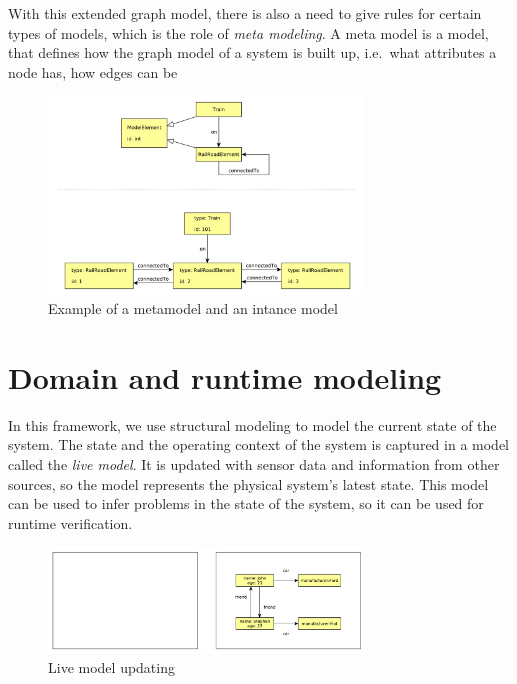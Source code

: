 With this extended graph model, there is also a need to give rules for certain types of models, which is the role of \emph{meta modeling}.
A meta model is a model, that defines how the graph model of a system is built up, i.e.\ what attributes a node has, how edges can be 



\begin{figure}[h]
	\begin{center}
		\includegraphics[width=0.75\textwidth]{figures/metamodel.pdf}
		\caption{ Example of a metamodel and an intance model }
		\label{fig:metamodel}
	\end{center}
\end{figure}


\section{Domain and runtime modeling}

In this framework, we use structural modeling to model the current state of the system. 
The state and the operating context of the system is captured in a model called the \emph{live model}.
It is updated with sensor data and information from other sources, so the model represents the physical system's latest state. 
This model can be used to infer problems in the state of the system, so it can be used for runtime verification.


\begin{figure}[h]
	\begin{center}
		\includegraphics[width=0.75\textwidth]{figures/live-models.pdf}
		\caption{Live model updating}
		\label{fig:live-models}
	\end{center}
\end{figure}


